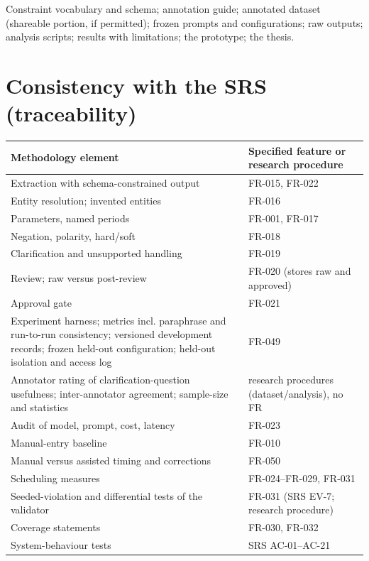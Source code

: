\documentclass[
  11pt,a4paper,oneside]{report}
\begin{document}
Constraint vocabulary and schema; annotation guide; annotated dataset
(shareable portion, if permitted); frozen prompts and configurations;
raw outputs; analysis scripts; results with limitations; the prototype;
the thesis.

\hypertarget{consistency-with-the-srs-traceability}{%
\section{Consistency with the SRS
(traceability)}\label{consistency-with-the-srs-traceability}}

\begin{longtable}[]{@{}p{\dimexpr(\linewidth-4\tabcolsep)/2\relax}p{\dimexpr(\linewidth-4\tabcolsep)/2\relax}@{}}
\toprule\noalign{}
Methodology element & Specified feature or research procedure \\
\midrule\noalign{}
\endhead
\bottomrule\noalign{}
\endlastfoot
Extraction with schema-constrained output & FR-015, FR-022 \\
Entity resolution; invented entities & FR-016 \\
Parameters, named periods & FR-001, FR-017 \\
Negation, polarity, hard/soft & FR-018 \\
Clarification and unsupported handling & FR-019 \\
Review; raw versus post-review & FR-020 (stores raw and approved) \\
Approval gate & FR-021 \\
Experiment harness; metrics incl. paraphrase and run-to-run consistency;
versioned development records; frozen held-out configuration; held-out
isolation and access log & FR-049 \\
Annotator rating of clarification-question usefulness; inter-annotator
agreement; sample-size and statistics & research procedures
(dataset/analysis), no FR \\
Audit of model, prompt, cost, latency & FR-023 \\
Manual-entry baseline & FR-010 \\
Manual versus assisted timing and corrections & FR-050 \\
Scheduling measures & FR-024--FR-029, FR-031 \\
Seeded-violation and differential tests of the validator & FR-031 (SRS
EV-7; research procedure) \\
Coverage statements & FR-030, FR-032 \\
System-behaviour tests & SRS AC-01--AC-21 \\

\end{longtable}
\end{document}
